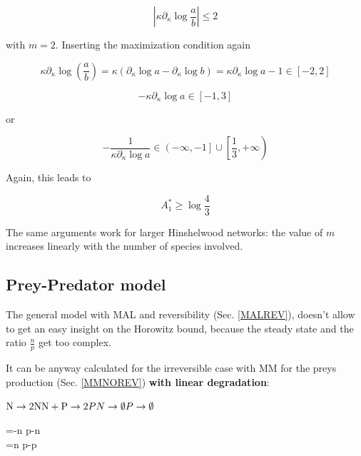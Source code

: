 \documentclass{article}
\begin{document}
	$$\left|\kappa \partial_{\kappa}\log \frac{a}{b}\right| \le 2 $$
	
	with $m=2$. Inserting the maximization condition again
	
	$$\kappa \partial_{\kappa}\log \left( \frac{a}{b}\right)=\kappa (\partial_{\kappa} \log a - \partial_{\kappa} \log b)=\kappa\partial_{\kappa} \log a-1 \in [-2,2]$$
	
	\begin{equation}
		-\kappa \partial_{\kappa} \log a\in [-1,3]
	\end{equation}
	
	or 
	
	\begin{equation}
		-\frac{1}{\kappa \partial_{\kappa} \log a} \in \left(-\infty ,-1\right] \cup \left[ \frac{1}{3}, +\infty \right)
	\end{equation}
	
	Again, this leads to 
	
	$$A_1^* \ge \log \frac{4}{3}$$
	
	The same arguments work for larger Hinshelwood networks: the value of $m$ increases linearly with the number of species involved.
	
	\subsection{Prey-Predator model}
	The general model with MAL and reversibility (Sec. \ref{MALREV}), doesn't allow to get an easy insight on the Horowitz bound, because the steady state and the ratio $\frac{n}{p}$ get too complex.
	
	\hfill \break
	
	It can be anyway calculated for the irreversible case with MM for the preys production (Sec. \ref{MMNOREV}) \textbf{with linear degradation}:
	\\
	
	\begin{minipage}{0.5 \textwidth}
		\begin{center}
			$\mathrm{N} \rightarrow\mathrm{2N}\\
			\mathrm{N+P} \rightarrow 2P\\
			N  \rightarrow \emptyset\\
			P \rightarrow \emptyset$
		\end{center}
		
	\end{minipage}
	\begin{minipage}{0.5 \textwidth}
		\begin{cases}
			=-n p-\lambda \delta n
			\\
			=n p-\delta p
		\end{cases}
	\end{minipage}
	
\end{document}
